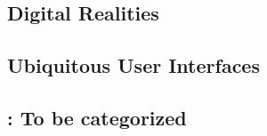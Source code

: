 \subsection{Digital Realities}




\subsection{Ubiquitous User Interfaces}  





\subsection{\todo : To be categorized}




